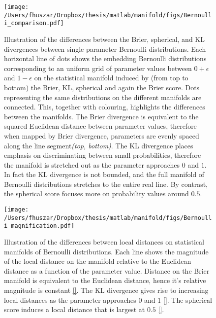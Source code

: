 
\begin{figure}
\begin{center}
 \texttt{[image: /Users/fhuszar/Dropbox/thesis/matlab/manifold/figs/Bernoulli\_comparison.pdf]}
\end{center}
\caption{Illustration of the differences between the Brier, spherical, and KL divergences between single parameter Bernoulli distributions. Each horizontal line of dots shows the embedding Bernoulli distributions corresponding to an uniform grid of parameter values between $0+\epsilon$ and $1-\epsilon$ on the statistical manifold induced by (from top to bottom) the Brier, KL, spherical and again the Brier score.  Dots representing the same distributions on the different manifolds are connected. This, together with colouring, highlights the differences between the manifolds.
The Brier divergence is equivalent to the squared Euclidean distance between parameter values, therefore when mapped by Brier divergence, parameters are evenly spaced along the line segment\emph{(top, bottom)}. The KL divergence places emphasis on discriminating between  small probabilities, therefore the manifold is stretched out as the parameter approaches $0$ and $1$. In fact the KL divergence is not bounded, and the full manifold of Bernoulli distributions stretches to the entire real line. By contrast, the spherical score focuses more on probability values around $0.5$.}
\end{figure}

\begin{figure}
\begin{center}
 \texttt{[image: /Users/fhuszar/Dropbox/thesis/matlab/manifold/figs/Bernoulli\_magnification.pdf]}
\end{center}
\caption{Illustration of the differences between local distances on statistical manifolds of Bernoulli distributions. Each line shows the magnitude of the local distance on the manifold relative to the Euclidean distance as a function of the parameter value. Distance on the Brier manifold is equivalent to the Euclidean distance, hence it's relative magnitude is constant \ref{}. The KL divergence gives rise to increasing local distances as the parameter approaches $0$ and $1$ \ref{}. The spherical score induces a local distance that is largest at $0.5$ \ref{}.}
\end{figure}

